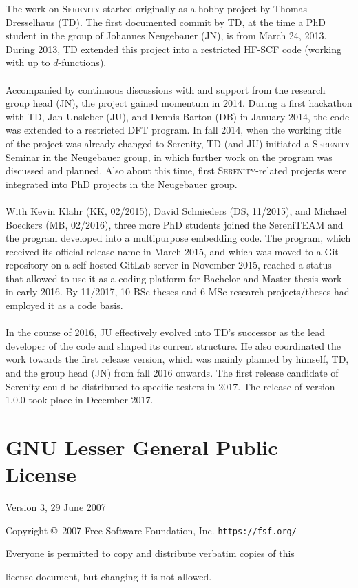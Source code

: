 \documentclass[bibliography=totocnumbered,a4paper,10pt,oneside]{scrbook}
\newcommand{
\serenity}{\textsc{Serenity}\xspace}
\begin{document}
The work on \serenity started originally as a hobby project
by Thomas Dresselhaus (TD). The first
documented commit by TD, at the time a PhD student in the group of
Johannes Neugebauer (JN), is from March 24, 2013. During 2013,
TD extended this project into a restricted HF-SCF code
(working with up to $d$-functions).\\
\\
Accompanied by continuous discussions with and support from the
research group head (JN), the project gained
momentum in 2014. During a first hackathon with TD, Jan Unsleber (JU),
and Dennis Barton (DB) in January 2014, the code was extended to a
restricted DFT program. In fall 2014, when the working title of the
project was already changed to Serenity, TD (and JU) initiated a
\serenity Seminar in the Neugebauer group, in which further work
on the program was discussed and planned. Also about this time,
first \serenity-related projects were integrated into PhD projects
in the Neugebauer group.\\
\\
With Kevin Klahr (KK, 02/2015), David Schnieders (DS, 11/2015), and Michael
Boeckers (MB, 02/2016), three more PhD students joined the SereniTEAM and
the program developed into a multipurpose embedding code.
The program, which received its official release name in March 2015, and
which was moved to a Git repository on a self-hosted GitLab server in
November 2015, reached a status that allowed to use it as a coding
platform for Bachelor and Master thesis work in early 2016. By 11/2017,
10 BSc theses and 6 MSc research projects/theses had employed it as
a code basis.\\
\\
In the course of 2016, JU effectively evolved into TD's successor as the
lead developer of the code and shaped its current structure. He also
coordinated the work towards the first release version, which was mainly
planned by himself, TD, and the group head (JN) from fall 2016 onwards.
The first release candidate of Serenity could be distributed to specific
testers in 2017. The release of version 1.0.0 took place in December 2017.


\clearpage
\chapter{GNU Lesser General Public License}\label{sec:lgpl}
\begin{center}
Version 3, 29 June 2007\\
\end{center}
\begin{center}
{\parindent 0in

Copyright \copyright\  2007 Free Software Foundation, Inc. \texttt{https://fsf.org/}

\bigskip
Everyone is permitted to copy and distribute verbatim copies of this

license document, but changing it is not allowed.}

\end{center}
\end{document}
